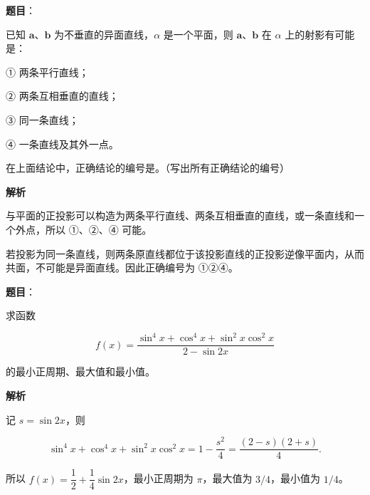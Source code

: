 \begin{answer}

\textbf{题目}：

已知 $\boldsymbol a\text{、}\boldsymbol b$ 为不垂直的异面直线，$\alpha$ 是一个平面，则 $\boldsymbol a\text{、}\boldsymbol b$ 在 $\alpha$ 上的射影有可能是：

① 两条平行直线；

② 两条互相垂直的直线；

③ 同一条直线；

④ 一条直线及其外一点。

在上面结论中，正确结论的编号是\gkblank{}。（写出所有正确结论的编号）

\textbf{解析}

与平面的正投影可以构造为两条平行直线、两条互相垂直的直线，或一条直线和一个外点，所以 ①、②、④ 可能。

若投影为同一条直线，则两条原直线都位于该投影直线的正投影逆像平面内，从而共面，不可能是异面直线。因此正确编号为 ①②④。


\end{answer}
\begin{answer}

\textbf{题目}：

求函数

\nopagebreak[4]
\[
f(x)=\frac{\sin^4x+\cos^4x+\sin^2x\cos^2x}{2-\sin2x}
\]

的最小正周期、最大值和最小值。

\textbf{解析}

记 $s=\sin2x$，则

\nopagebreak[4]
\[
\sin^4x+\cos^4x+\sin^2x\cos^2x
=1-\frac{s^2}{4}
=\frac{(2-s)(2+s)}4.
\]

所以 $f(x)=\dfrac12+\dfrac14\sin2x$，最小正周期为 $\pi$，最大值为 $3/4$，最小值为 $1/4$。


\end{answer}

